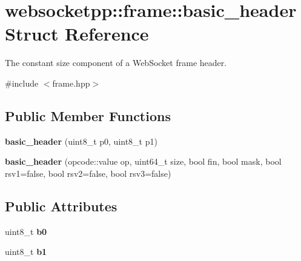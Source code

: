 \hypertarget{structwebsocketpp_1_1frame_1_1basic__header}{}\section{websocketpp\+:\+:frame\+:\+:basic\+\_\+header Struct Reference}
\label{structwebsocketpp_1_1frame_1_1basic__header}


The constant size component of a Web\+Socket frame header.  




{\ttfamily \#include $<$frame.\+hpp$>$}

\subsection*{Public Member Functions}
\begin{DoxyCompactItemize}
\item 
{\bfseries basic\+\_\+header} (uint8\+\_\+t p0, uint8\+\_\+t p1)\hypertarget{structwebsocketpp_1_1frame_1_1basic__header_ae5d978e632e2de210f0282d474870774}{}\label{structwebsocketpp_1_1frame_1_1basic__header_ae5d978e632e2de210f0282d474870774}

\item 
{\bfseries basic\+\_\+header} (opcode\+::value op, uint64\+\_\+t size, bool fin, bool mask, bool rsv1=false, bool rsv2=false, bool rsv3=false)\hypertarget{structwebsocketpp_1_1frame_1_1basic__header_aeacd25eb8ca55f29250dc5aff78a1788}{}\label{structwebsocketpp_1_1frame_1_1basic__header_aeacd25eb8ca55f29250dc5aff78a1788}

\end{DoxyCompactItemize}
\subsection*{Public Attributes}
\begin{DoxyCompactItemize}
\item 
uint8\+\_\+t {\bfseries b0}\hypertarget{structwebsocketpp_1_1frame_1_1basic__header_a9dcac77e651c455cf3aed687dbd87d7e}{}\label{structwebsocketpp_1_1frame_1_1basic__header_a9dcac77e651c455cf3aed687dbd87d7e}

\item 
uint8\+\_\+t {\bfseries b1}\hypertarget{structwebsocketpp_1_1frame_1_1basic__header_a631a0cbf798d7996a4de1d62f03cc470}{}\label{structwebsocketpp_1_1frame_1_1basic__header_a631a0cbf798d7996a4de1d62f03cc470}

\end{DoxyCompactItemize}


